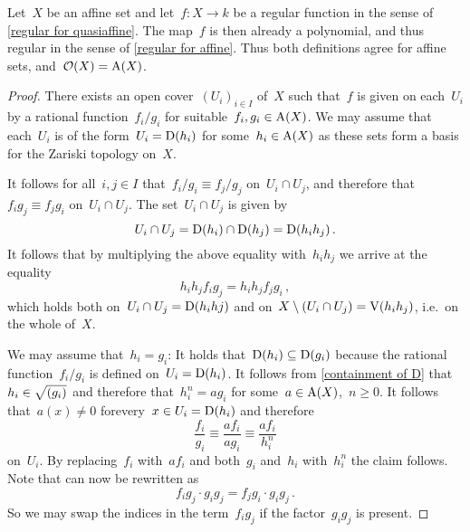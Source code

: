 \begin{proposition}
  \label{regular on affine is polynomial}
  Let~$X$ be an affine set and let~$f \colon X \to k$ be a regular function in the sense of \cref{regular for quasiaffine}.
  The map~$f$ is then already a polynomial, and thus regular in the sense of \cref{regular for affine}.
  Thus both definitions agree for affine sets, and~$\mathcal{O}(X) = \operatorname{A}(X)$.
\end{proposition}


\begin{proof}
  There exists an open cover~$(U_i)_{i \in I}$ of~$X$ such that~$f$ is given on each~$U_i$ by a rational function~$f_i/g_i$ for suitable~$f_i, g_i \in \operatorname{A}(X)$.
  We may assume that each~$U_i$ is of the form~$U_i = \operatorname{D}(h_i)$ for some~$h_i \in \operatorname{A}(X)$ as these sets form a basis for the Zariski topology on~$X$.
  
  It follows for all~$i,j \in I$ that~$f_i/g_i \equiv f_j/g_j$ on~$U_i \cap U_j$, and therefore that~$f_i g_j \equiv f_j g_i$ on~$U_i \cap U_j$.
  The set~$U_i \cap U_j$ is given by
  \[
    U_i \cap U_j = \operatorname{D}(h_i) \cap \operatorname{D}(h_j) = \operatorname{D}(h_i h_j) \,.
  \]
  It follows that by multiplying the above equality with~$h_i h_j$ we arrive at the equality
  \begin{equation}
  \label{extended equality on intersections}
      h_i h_j f_i g_j
    = h_i h_j f_j g_i \,,
  \end{equation}
  which holds both on~$U_i \cap U_j = \operatorname{D}(h_i hj)$ and on~$X \setminus (U_i \cap U_j) = \operatorname{V}(h_i h_j)$, i.e.\ on the whole of~$X$.
  
  We may assume that~$h_i = g_i$:
  It holds that~$\operatorname{D}(h_i) \subseteq \operatorname{D}(g_i)$ because the rational function~$f_i/g_i$ is defined on~$U_i = \operatorname{D}(h_i)$.
  It follows from \cref{containment of D} that~$h_i \in \sqrt{(g_i)}$ and therefore that~$h_i^n = a g_i$ for some~$a \in \operatorname{A}(X)$,~$n \geq 0$.
  It follows that~$a(x) \neq 0$ forevery~$x \in U_i = \operatorname{D}(h_i)$ and therefore 
  \[
            \frac{f_i}{g_i}
    \equiv  \frac{a f_i}{a g_i}
    \equiv   \frac{a f_i}{h_i^n}
  \]
  on~$U_i$.
  By replacing~$f_i$ with~$a f_i$ and both~$g_i$ and~$h_i$ with~$h_i^n$ the claim follows.
  Note that  can now be rewritten as
  \begin{equation}
  \label{equality on intersections}
        f_i g_j \cdot g_i g_j
      = f_j g_i \cdot g_i g_j \,.
  \end{equation}
  So we may swap the indices in the term~$f_i g_j$ if the factor~$g_i g_j$ is present.
  

\end{proof}
